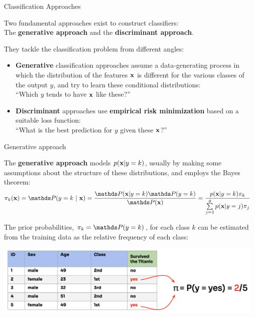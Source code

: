 \documentclass[11pt,compress,t,notes=noshow, xcolor=table]{beamer}
\begin{document}
\begin{vbframe}{Classification Approaches}

  Two fundamental approaches exist to construct classifiers:\\
  The \textbf{generative approach} and the \textbf{discriminant approach}.

\lz
They tackle the classification problem from different angles:

\begin{itemize}
\item \textbf{Generative} classification approaches assume a data-generating process in which the distribution of the features $\mathbf{x}$ is different for the various classes of the output $y$, and try to learn these conditional distributions:\\ \enquote{Which $y$ tends to have $\mathbf{x}$ like these?}
\lz
\item \textbf{Discriminant} approaches use \textbf{empirical risk minimization} based on a suitable loss function:\\ \enquote{What is the best prediction for $y$ given these $\mathbf{x}$?}
\end{itemize}
\end{vbframe}

\begin{vbframe}{Generative approach}

The \textbf{generative approach}
models $p(\mathbf{x} | y= k)$, usually by making some assumptions about the structure of these distributions, and employs the Bayes theorem:
$$\pikx = \postk = \frac{\P(\xv | y = k) \P(y = k)}{\P(\xv)} = \frac{\pdfxyk \pik}{\sumjg \pdfxyk[j] \pi_j}$$

The prior probabilities, $\pi_k = \P(y = k)$, for each class $k$ can be estimated from the training data as the relative frequency of each class:

\begin{center}
\includegraphics{figure_man/prior_probabilities.png} 
\end{center}

\end{vbframe}
\end{document}
